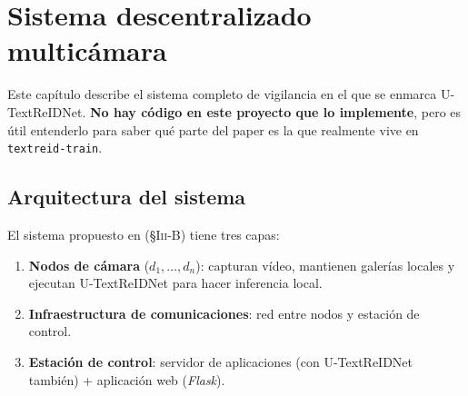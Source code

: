 \chapter{Sistema descentralizado multicámara}
\label{cap:sistema-descentralizado}

Este capítulo describe el sistema completo de vigilancia en el que
se enmarca U-TextReIDNet. \textbf{No hay código en este proyecto
que lo implemente}, pero es útil entenderlo para saber qué parte
del paper es la que realmente vive en \texttt{textreid-train}.

\section{Arquitectura del sistema}

El sistema propuesto en  (§\textsc{Iii}-B)
tiene tres capas:

\begin{enumerate}
  \item \textbf{Nodos de cámara} ($d_1, \ldots, d_n$): capturan
        vídeo, mantienen galerías locales y ejecutan
        U-TextReIDNet para hacer inferencia local.
  \item \textbf{Infraestructura de comunicaciones}: red entre
        nodos y estación de control.
  \item \textbf{Estación de control}: servidor de aplicaciones
        (con U-TextReIDNet también) + aplicación web
        (\emph{Flask}).
\end{enumerate}

